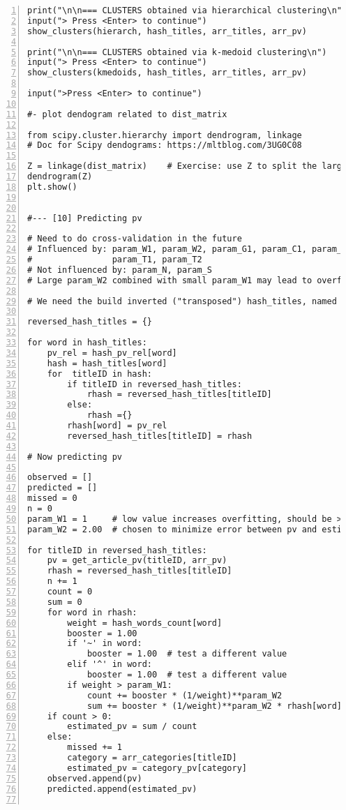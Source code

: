 \documentclass[oneside,10pt]{book}
\begin{document}
\begin{lstlisting}[numbers=left]
print("\n\n=== CLUSTERS obtained via hierarchical clustering\n")
input("> Press <Enter> to continue")
show_clusters(hierarch, hash_titles, arr_titles, arr_pv)

print("\n\n=== CLUSTERS obtained via k-medoid clustering\n")
input("> Press <Enter> to continue")
show_clusters(kmedoids, hash_titles, arr_titles, arr_pv)

input(">Press <Enter> to continue")

#- plot dendogram related to dist_matrix

from scipy.cluster.hierarchy import dendrogram, linkage
# Doc for Scipy dendograms: https://mltblog.com/3UG0C08

Z = linkage(dist_matrix)    # Exercise: use Z to split the large group
dendrogram(Z)  
plt.show()


#--- [10] Predicting pv 

# Need to do cross-validation in the future
# Influenced by: param_W1, param_W2, param_G1, param_C1, param_C2, param_A, param_D
#                param_T1, param_T2
# Not influenced by: param_N, param_S
# Large param_W2 combined with small param_W1 may lead to overfitting

# We need the build inverted ("transposed") hash_titles, named reversed_hash_titles

reversed_hash_titles = {}

for word in hash_titles:
    pv_rel = hash_pv_rel[word]
    hash = hash_titles[word]
    for  titleID in hash:
        if titleID in reversed_hash_titles:
            rhash = reversed_hash_titles[titleID]
        else:
            rhash ={}
        rhash[word] = pv_rel
        reversed_hash_titles[titleID] = rhash

# Now predicting pv

observed = []
predicted = []
missed = 0
n = 0
param_W1 = 1     # low value increases overfitting, should be >= 1
param_W2 = 2.00  # chosen to minimize error between pv and estimated_pv 

for titleID in reversed_hash_titles:
    pv = get_article_pv(titleID, arr_pv)
    rhash = reversed_hash_titles[titleID]
    n += 1
    count = 0
    sum = 0
    for word in rhash:
        weight = hash_words_count[word]
        booster = 1.00
        if '~' in word:
            booster = 1.00  # test a different value
        elif '^' in word:
            booster = 1.00  # test a different value
        if weight > param_W1:
            count += booster * (1/weight)**param_W2
            sum += booster * (1/weight)**param_W2 * rhash[word]
    if count > 0:
        estimated_pv = sum / count
    else:
        missed += 1
        category = arr_categories[titleID]
        estimated_pv = category_pv[category]
    observed.append(pv)
    predicted.append(estimated_pv)
    

\end{lstlisting}
\end{document}

